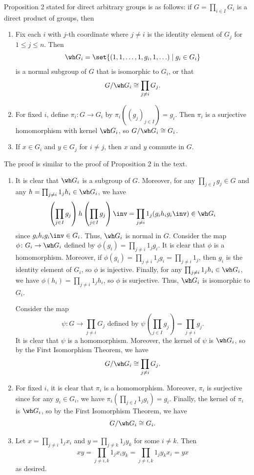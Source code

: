 \begin{sol}
    Proposition 2 stated for direct arbitrary groups is as follows: if $G = \prod_{i \in I} G_i$ is a direct product of groups, then
    \begin{enumerate}
        \item Fix each $i$ with $j$-th coordinate where $j \neq i$ is the identity element of $G_j$ for $1 \leq j \leq n$.
	Then
        \[
        	\wh G_i = \set{(1, 1, \ldots, 1, g_i, 1, \ldots) \mid g_i \in G_i}
        \] 
        is a normal subgroup of $G$ that is isomorphic to $G_i$, or that
        \[
        	G/\wh G_i \cong \prod_{j \neq i} G_j.
        \]
        \item For fixed $i$, define $\pi_i \colon G \to G_i$ by $\pi_i((g_j)_{j \in I}) = g_i$.
	Then $\pi_i$ is a surjective homomorphism with kernel $\wh G_i$, so $G/\wh G_i \cong G_i$.
        \item If $x \in G_i$ and $y \in G_j$ for $i \neq j$, then $x$ and $y$ commute in $G$.
    \end{enumerate}
    The proof is similar to the proof of Proposition 2 in the text.
    \begin{enumerate}
        \item It is clear that $\wh G_i$ is a subgroup of $G$.
	Moreover, for any $\prod_{j \in I} g_j \in G$ and any $h = \prod_{j \neq i} 1_j h_i \in \wh G_i$, we have
        \[
        	\left(\prod_{j \in I} g_j\right)h\left(\prod_{j \in I} g_j\right)\inv = \prod_{j \neq i} 1_j (g_i h_i g_i\inv) \in \wh G_i
        \]
        since $g_i h_i g_i\inv \in G_i$.
	Thus, $\wh G_i$ is normal in $G$.
	Consider the map $\phi \colon G_i \to \wh G_i$ defined by $\phi(g_i) = \prod_{j \neq i} 1_j g_i$.
	It is clear that $\phi$ is a homomorphism.
	Moreover, if $\phi(g_i) = \prod_{j \neq i} 1_j g_i = \prod_{j \neq i} 1_j$, then $g_i$ is the identity element of $G_i$, so $\phi$ is injective.
	Finally, for any $\prod_{j \neq i} 1_j h_i \in \wh G_i$, we have $\phi(h_i) = \prod_{j \neq i} 1_j h_i$, so $\phi$ is surjective.
	Thus, $\wh G_i$ is isomorphic to $G_i$. 
        
        Consider the map
        \[
        	\psi \colon G \to \prod_{j \neq i} G_j \text{ defined by } \psi\left(\prod_{j \in I} g_j\right) = \prod_{j \neq i} g_j.
        \]
        It is clear that $\psi$ is a homomorphism.
	Moreover, the kernel of $\psi$ is $\wh G_i$, so by the First Isomorphism Theorem, we have
        \[
        	G/\wh G_i \cong \prod_{j \neq i} G_j.
        \]
        \item For fixed $i$, it is clear that $\pi_i$ is a homomorphism.
	Moreover, $\pi_i$ is surjective since for any $g_i \in G_i$, we have $\pi_i(\prod_{j \in I} 1_j g_i) = g_i$.
	Finally, the kernel of $\pi_i$ is $\wh G_i$, so by the First Isomorphism Theorem, we have
        \[
        	G/\wh G_i \cong G_i.
        \]
        \item Let $x = \prod_{j \neq i} 1_j x_i$ and $y = \prod_{j \neq k} 1_j y_k$ for some $i \neq k$.
	Then
        \[
        	xy = \prod_{j \neq i, k} 1_j x_i y_k = \prod_{j \neq i, k} 1_j y_k x_i = yx
        \]
        as desired.
    \end{enumerate}
\end{sol}

